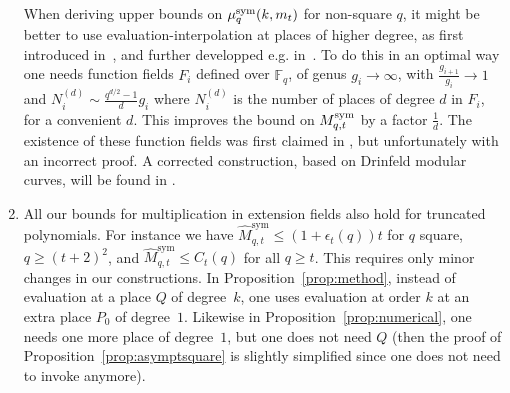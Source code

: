 \documentclass[11pt]{article}
\begin{document}
\begin{enumerate}
When deriving upper bounds on $\mu^{\textrm{sym}}_q(k,m_t)$ for non-square $q$, it might be better to use evaluation-interpolation
at places of higher degree, as first introduced in~\cite{BR04}, and further developped e.g. in~\cite{CCXY12,Randriam12}.
To do this in an optimal way one needs function fields $F_i$ defined over $\mathbb{F}_q$,
of genus $g_i\to\infty$, with $\frac{g_{i+1}}{g_i}\to 1$ and $N_i^{(d)}\sim\frac{q^{d/2}-1}{d}g_i$
where $N_i^{(d)}$ is the number of places of degree $d$ in $F_i$, for a convenient $d$.
This improves the bound on $M^{\textrm{sym}}_{q,t}$ by a factor $\frac{1}{d}$.
The existence of these function fields was first claimed in \cite{CCXY12}, but unfortunately with an incorrect proof.
A corrected construction, based on Drinfeld modular curves, will be found in \cite{BBRR20+}.
\item All our bounds for multiplication in extension fields also hold for truncated polynomials.
For instance we have $\hat{M}^{\textrm{sym}}_{q,t}\leq(1+\epsilon_t(q))t$ for $q$ square, $q\geq(t+2)^2$,
and $\hat{M}^{\textrm{sym}}_{q,t}\leq C_t(q)$ for all $q\geq t$.
This requires only minor changes in our constructions.
In Proposition~\ref{prop:method}, instead of evaluation at a place $Q$ of degree~$k$, one uses evaluation at order $k$
at an extra place $P_0$ of degree~$1$.
Likewise in Proposition~\ref{prop:numerical}, one needs one more place of degree~$1$, but one does not need $Q$
(then the proof of Proposition~\ref{prop:asymptsquare} is slightly simplified since one does not need to invoke \cite[Cor.~5.2.10]{Stichtenoth09} anymore).
\end{enumerate}

\small


\end{document}
